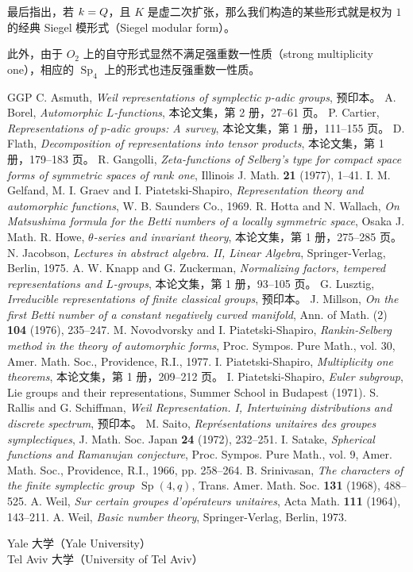 最后指出，若 $k=Q$，且 $K$ 是虚二次扩张，那么我们构造的某些形式就是权为 $1$ 的经典 Siegel 模形式（Siegel modular form）。

此外，由于 $O_2$ 上的自守形式显然不满足强重数一性质（strong multiplicity one），相应的 $\operatorname{Sp}_4$ 上的形式也违反强重数一性质。

\begin{thebibliography}{GGP}
 C. Asmuth, \emph{Weil representations of symplectic $p$-adic groups}, 预印本。
 A. Borel, \emph{Automorphic $L$-functions}, 本论文集，第 2 册，27--61 页。
 P. Cartier, \emph{Representations of $p$-adic groups: A survey}, 本论文集，第 1 册，111--155 页。
 D. Flath, \emph{Decomposition of representations into tensor products}, 本论文集，第 1 册，179--183 页。
 R. Gangolli, \emph{Zeta-functions of Selberg's type for compact space forms of symmetric spaces of rank one}, Illinois J. Math. \textbf{21} (1977), 1--41.
 I. M. Gelfand, M. I. Graev and I. Piatetski-Shapiro, \emph{Representation theory and automorphic functions}, W. B. Saunders Co., 1969.
 R. Hotta and N. Wallach, \emph{On Matsushima formula for the Betti numbers of a locally symmetric space}, Osaka J. Math.
 R. Howe, \emph{$\theta$-series and invariant theory}, 本论文集，第 1 册，275--285 页。
 N. Jacobson, \emph{Lectures in abstract algebra. II, Linear Algebra}, Springer-Verlag, Berlin, 1975.
 A. W. Knapp and G. Zuckerman, \emph{Normalizing factors, tempered representations and $L$-groups}, 本论文集，第 1 册，93--105 页。
 G. Lusztig, \emph{Irreducible representations of finite classical groups}, 预印本。
 J. Millson, \emph{On the first Betti number of a constant negatively curved manifold}, Ann. of Math. (2) \textbf{104} (1976), 235--247.
 M. Novodvorsky and I. Piatetski-Shapiro, \emph{Rankin-Selberg method in the theory of automorphic forms}, Proc. Sympos. Pure Math., vol. 30, Amer. Math. Soc., Providence, R.I., 1977.
 I. Piatetski-Shapiro, \emph{Multiplicity one theorems}, 本论文集，第 1 册，209--212 页。
 I. Piatetski-Shapiro, \emph{Euler subgroup}, Lie groups and their representations, Summer School in Budapest (1971).
 S. Rallis and G. Schiffman, \emph{Weil Representation. I, Intertwining distributions and discrete spectrum}, 预印本。
 M. Saito, \emph{Représentations unitaires des groupes symplectiques}, J. Math. Soc. Japan \textbf{24} (1972), 232--251.
 I. Satake, \emph{Spherical functions and Ramanujan conjecture}, Proc. Sympos. Pure Math., vol. 9, Amer. Math. Soc., Providence, R.I., 1966, pp. 258--264.
 B. Srinivasan, \emph{The characters of the finite symplectic group $\operatorname{Sp}(4,q)$}, Trans. Amer. Math. Soc. \textbf{131} (1968), 488--525.
 A. Weil, \emph{Sur certain groupes d'opérateurs unitaires}, Acta Math. \textbf{111} (1964), 143--211.
 A. Weil, \emph{Basic number theory}, Springer-Verlag, Berlin, 1973.
\end{thebibliography}

\noindent Yale 大学（Yale University）\\
Tel Aviv 大学（University of Tel Aviv）
